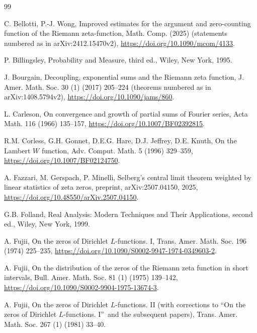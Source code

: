 \documentclass[preprint,12pt]{elsarticle}
\numberwithin{equation}{section}
\theoremstyle{plain}
\theoremstyle{definition}
\theoremstyle{remark}
\begin{document}
\begin{thebibliography}{99}

C. Bellotti, P.-J. Wong, Improved estimates for the argument and zero-counting function of the Riemann zeta-function, Math. Comp. (2025) (statements numbered as in arXiv:2412.15470v2), \href{https://doi.org/10.1090/mcom/4133}{https://doi.org/10.1090/mcom/4133}.

P. Billingsley, Probability and Measure, third ed., Wiley, New York, 1995.

J. Bourgain, Decoupling, exponential sums and the Riemann zeta function, J. Amer. Math. Soc. 30 (1) (2017) 205--224 (theorems numbered as in arXiv:1408.5794v2), \href{https://doi.org/10.1090/jams/860}{https://doi.org/10.1090/jams/860}.

L. Carleson, On convergence and growth of partial sums of Fourier series, Acta Math. 116 (1966) 135--157, \href{https://doi.org/10.1007/BF02392815}{https://doi.org/10.1007/BF02392815}.

R.M. Corless, G.H. Gonnet, D.E.G. Hare, D.J. Jeffrey, D.E. Knuth, On the Lambert $W$ function, Adv. Comput. Math. 5 (1996) 329--359, \href{https://doi.org/10.1007/BF02124750}{https://doi.org/10.1007/BF02124750}.

A. Fazzari, M. Gerspach, P. Minelli, Selberg's central limit theorem weighted by linear statistics of zeta zeros, preprint, arXiv:2507.04150, 2025, \href{https://doi.org/10.48550/arXiv.2507.04150}{https://doi.org/10.48550/arXiv.2507.04150}.

G.B. Folland, Real Analysis: Modern Techniques and Their Applications, second ed., Wiley, New York, 1999.




A. Fujii, On the zeros of Dirichlet $L$-functions. I, Trans. Amer. Math. Soc. 196 (1974) 225--235, \href{https://doi.org/10.1090/S0002-9947-1974-0349603-2}{https://doi.org/10.1090/S0002-9947-1974-0349603-2}.

A. Fujii, On the distribution of the zeros of the Riemann zeta function in short intervals, Bull. Amer. Math. Soc. 81 (1) (1975) 139--142, \href{https://doi.org/10.1090/S0002-9904-1975-13674-3}{https://doi.org/10.1090/S0002-9904-1975-13674-3}.

A. Fujii, On the zeros of Dirichlet $L$-functions. II (with corrections to ``On the zeros of Dirichlet $L$-functions. I\textquotedblright\ and the subsequent papers), Trans. Amer. Math. Soc. 267 (1) (1981) 33--40.


\end{thebibliography}
\end{document}
